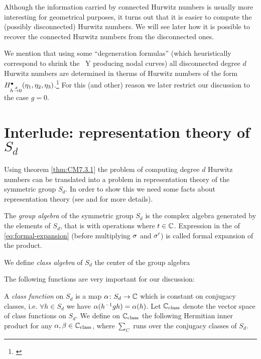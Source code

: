 \documentclass[../main/main.tex]{subfiles}
\begin{document}
Although the information carried by connected Hurwitz numbers is usually more interesting for geometrical purposes, it turns out that it is easier to compute the (possibly disconnected) Hurwitz numbers. We will see later how it is possible to recover the connected Hurwitz numbers from the disconnected ones. 

We mention that using some ``degeneration formulas'' (which heuristically correspond to shrink the \rs\ Y producing nodal curves) all disconnected degree $d$ Hurwitz numbers are determined in therms of Hurwitz numbers of the form $H^\bullet_{h\overset d\to0}(\eta_1,\eta_2,\eta_3)$.\footnote{\cite[Thm. 7.5.3]{CM}} For this (and other) reason we later restrict our discussion to the case $g=0$. 

\section{Interlude: representation theory of $S_d$}

Using theorem \ref{thm:CM7.3.1} the problem of computing degree $d$ Hurwitz numbers can be translated into a problem in representation theory of the symmetric group $S_d$. In order to show this we need some facts about representation theory (see \cite[Part I]{FH} and \cite[§8]{CM} for more details). 

\begin{definition}
	The \emph{group algebra} of the symmetric group $S_d$ is the complex algebra generated by the elements of $S_d$, that is
	with operations
	where $t\in\mathbb C$. Expression in the \rhs of \eqref{eq:formal-expansion} (before multiplying $\sigma$ and $\sigma'$) is called formal expansion of the product.
	
	We define \emph{class algebra} of $S_d$ the center of the group algebra
\end{definition}

The following functions are very important for our discussion:

\begin{definition}
	A \emph{class function} on $S_d$ is a map $\alpha\colon S_d\to\mathbb C$ which is constant on conjugacy classes, i.e. $\forall h\in S_d$ we have $\alpha(h^{-1}gh)=\alpha(h)$. Let $\mathbb C_{\text{class}}$ denote the vector space of class functions on $S_d$. We define on $\mathbb C_{\text{class}}$ the following Hermitian inner product
 	for any $\alpha,\beta\in \mathbb C_{\text{class}}$, where $\sum_C$ runs over the conjugacy classes of $S_d$. 
\end{definition}
\end{document}
